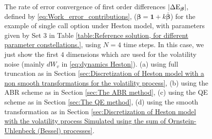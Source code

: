 \begin{figure}[htb]
	\caption{The rate of error convergence of first order differences $\left\lvert\Delta \text{E}_{\boldsymbol{\beta}}\right\rvert$, defined by \eqref{eq:Work_error_contributions}, ($\boldsymbol{\beta}=\mathbf{1}+k \bar{\boldsymbol{\beta}}$) for the example of single call option under Heston model, with parameters given by Set $3$ in Table \ref{table:Reference solution, for different parameter constellations.}, using $N=4$ time steps. In this case, we just show  the first  $4$ dimensions which are used for the volatility noise (mainly $dW_v$ in \eqref{eq:dynamics Heston}). (a) using full truncation as in Section \ref{sec:Discretization of Heston model with a non smooth transformations for the volatility process}, (b) using the ABR scheme as in Section \ref{sec:The ABR method}, (c) using the QE scheme as in Section \ref{sec:The QE method}, (d) using the smooth transformation as in Section \ref{sec:Discretization of Heston model with the volatility process Simulated using the sum of  Ornstein-Uhlenbeck (Bessel) processes}.}
	\label{fig:first_diff_Heston_call_N_4_set4}	
\end{figure}
\FloatBarrier
  
